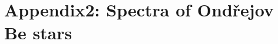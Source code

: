 \graphicspath{{pic/be/}}
\chapter{Appendix2: Spectra of Ondřejov Be stars}
\begin{figure}[!htbp]
  \centering
\end{figure}

\begin{figure}[!htbp]    
  \centering
\end{figure}

